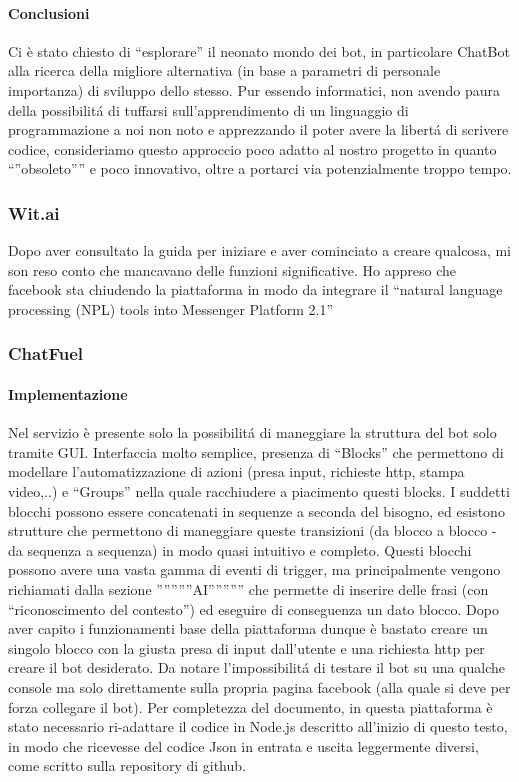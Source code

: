 \documentclass[]{article}
\begin{document}
\paragraph{Conclusioni}
 Ci è stato chiesto di “esplorare” il neonato mondo dei bot, in particolare ChatBot alla ricerca della migliore alternativa (in base a parametri di personale importanza) di sviluppo dello stesso. Pur essendo informatici, non avendo paura della possibilitá di tuffarsi sull’apprendimento di un linguaggio di programmazione a noi non noto e apprezzando il poter avere la libertá di scrivere codice, consideriamo questo approccio poco adatto al nostro progetto in quanto “”obsoleto”” e poco innovativo, oltre a portarci via potenzialmente troppo tempo.
 
\subsubsection{Wit.ai}
Dopo aver consultato la guida per iniziare e aver cominciato a creare qualcosa, mi son reso conto che mancavano delle funzioni significative. Ho appreso che facebook sta chiudendo la piattaforma in modo da integrare il “natural language processing (NPL)  tools into Messenger Platform 2.1”

\subsubsection{ChatFuel}
\paragraph{Implementazione}
Nel servizio è presente solo la possibilitá di maneggiare la struttura del bot solo tramite GUI. Interfaccia molto semplice, presenza di “Blocks” che permettono di modellare l’automatizzazione di azioni (presa input, richieste http, stampa video,..) e “Groups” nella quale racchiudere a piacimento questi blocks. I suddetti blocchi possono essere concatenati in sequenze a seconda del bisogno, ed esistono strutture che permettono di maneggiare queste transizioni (da blocco a blocco - da sequenza a sequenza) in modo quasi intuitivo e completo. Questi blocchi possono avere una vasta gamma di eventi di trigger, ma principalmente vengono richiamati dalla sezione ”””””AI””””” che permette di inserire delle frasi (con “riconoscimento del contesto”)  ed eseguire di conseguenza un dato blocco. Dopo aver capito i funzionamenti base della piattaforma dunque è bastato creare un singolo blocco con la giusta presa di input dall’utente e una richiesta http per creare il bot desiderato. Da notare l’impossibilitá di testare il bot su una qualche console ma solo direttamente sulla propria pagina facebook (alla quale si deve per forza collegare il bot). Per completezza del documento, in questa piattaforma è stato necessario ri-adattare il codice in Node.js descritto all’inizio di questo testo, in modo che ricevesse del codice Json in entrata e uscita leggermente diversi, come scritto sulla repository di github.
\end{document}

